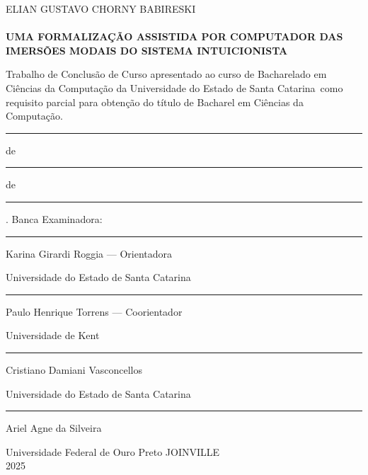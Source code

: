 \begin{titlepage}
    \begin{center}
        \textsf{ELIAN GUSTAVO CHORNY BABIRESKI} \\
         \\
        \vfill
        \vfill
        \vfill
        \textsf{\textbf{UMA FORMALIZAÇÃO ASSISTIDA POR COMPUTADOR DAS IMERSÕES MODAIS DO SISTEMA INTUICIONISTA}} \\
        \vfill
        \vfill
        \vfill
        \begin{flushright}
            \begin{minipage}{0.5\textwidth}
                \singlespacing
                
                \textsf{\noindent Trabalho de Conclusão de Curso apresentado ao curso de Bacharelado em Ciências da Computação da Universidade do Estado de Santa Catarina\ como requisito parcial para obtenção do título de Bacharel em Ciências da Computação.}
            \end{minipage}
        \end{flushright}
        \vfill
        \vfill
        \vfill
        \rule{1cm}{.4pt} de \rule{3cm}{.4pt} de \rule{2cm}{.4pt}.
        \vfill
        \vfill
        \vfill
        \textsf{Banca Examinadora:}
        \vfill
        \rule{.8\linewidth}{.4pt}

        \textsf{Karina Girardi Roggia --- Orientadora}

        \textsf{Universidade do Estado de Santa Catarina}
        \vfill
        \rule{.8\linewidth}{.4pt}

        \textsf{Paulo Henrique Torrens --- Coorientador}

        \textsf{Universidade de Kent}
        \vfill
        \rule{.8\linewidth}{.4pt}

        \textsf{Cristiano Damiani Vasconcellos}

        \textsf{Universidade do Estado de Santa Catarina}
        \vfill
        \rule{.8\linewidth}{.4pt}

        \textsf{Ariel Agne da Silveira}

        \textsf{Universidade Federal de Ouro Preto}
        \vfill
        \vfill
        \vfill
        \textsf{JOINVILLE} \\
        \textsf{2025}
    \end{center}
\end{titlepage}